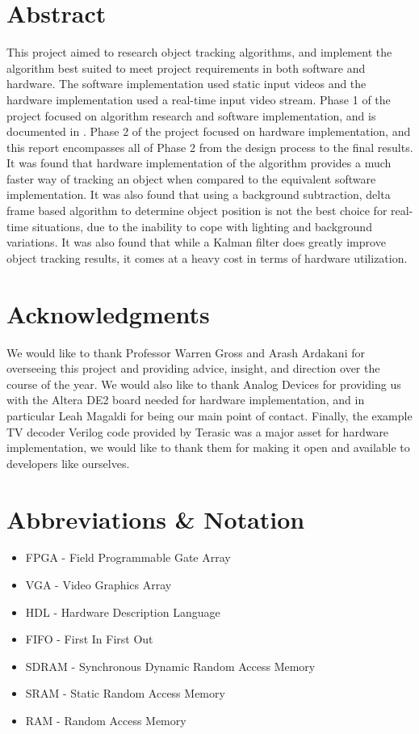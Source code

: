 \documentclass[11pt]{article} %
\begin{document}
\section*{Abstract}
This project aimed to research object tracking algorithms, and implement the algorithm best suited to meet project requirements in both software and hardware. The software implementation used static input videos and the hardware implementation used a real-time input video stream. Phase 1 of the project focused on algorithm research and software implementation, and is documented in \cite{phase1}. Phase 2 of the project focused on hardware implementation, and this report encompasses all of Phase 2 from the design process to the final results. It was found that hardware implementation of the algorithm provides a much faster way of tracking an object when compared to the equivalent software implementation. It was also found that using a background subtraction, delta frame based algorithm to determine object position is not the best choice for real-time situations, due to the inability to cope with lighting and background variations. It was also found that while a Kalman filter does greatly improve object tracking results, it comes at a heavy cost in terms of hardware utilization.
\section*{Acknowledgments}
We would like to thank Professor Warren Gross and Arash Ardakani for overseeing this project and providing advice, insight, and direction over the course of the year. We would also like to thank Analog Devices for providing us with the Altera DE2 board needed for hardware implementation, and in particular Leah Magaldi for being our main point of contact. Finally, the example TV decoder Verilog code provided by Terasic was a major asset for hardware implementation, we would like to thank them for making it open and available to developers like ourselves. 
\pagebreak
\tableofcontents
\pagebreak
\section{Abbreviations \& Notation}
\begin{itemize}
\item[] FPGA - Field Programmable Gate Array
\item[] VGA - Video Graphics Array
\item[] HDL - Hardware Description Language
\item[] FIFO - First In First Out
\item[] SDRAM - Synchronous Dynamic Random Access Memory
\item[] SRAM - Static Random Access Memory
\item[] RAM - Random Access Memory
\end{itemize}
\end{document}
